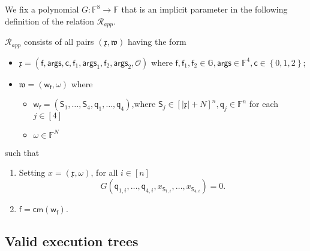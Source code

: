 \documentclass[11pt]{article} %
\newcommand{\G}{\ensuremath{{\mathbb G}}\xspace}
\newcommand{\F}{\ensuremath{\mathbb F}\xspace}
\newcommand{\cm}{\ensuremath{\mathsf{cm}}\xspace}
\newcommand{\wit}{\ensuremath{\mathsf{\omega}}\xspace}
\newcommand{\rel}{\ensuremath{\mathcal{R}}\xspace}
\newcommand{\set}[1]{\ensuremath{\left\{#1\right\}}\xspace}
\newcommand{\perm}{\mathsf{S}}
\newcommand{\f}{\ensuremath{\mathsf{f}}\xspace}
\newcommand{\relapp}{\ensuremath{\rel_{app}}\xspace}
\newcommand{\ops}{\ensuremath{\mathcal{O}}\xspace}
\newcommand{\instapp}{\ensuremath{\mathfrak{x}}\xspace}
\newcommand{\witapp}{\ensuremath{\mathfrak{w}}\xspace}
\newcommand{\witf}{\ensuremath{\mathsf{w_f}}\xspace}
\newcommand{\sel}{\ensuremath{\mathsf{q}}\xspace}
\newcommand{\args}{\ensuremath{\mathsf{args}}\xspace}
\newcommand{\callnum}{\ensuremath{\mathsf{c}}\xspace}
\begin{document}
We fix a polynomial $G:\F^8\to \F$ that is an implicit parameter in the following definition of the relation \relapp.

\relapp consists of all pairs $(\instapp, \witapp)$ having the form 
\begin{itemize}
 \item 
$\instapp= (\f,\args,\callnum, \f_1,\args_1, \f_2,\args_2,\ops)$
where $\f,\f_1,\f_2 \in \G,\args\in \F^4,\callnum\in \set{0,1,2}$; 
\item $\witapp=(\witf,\wit)$
where 
\begin{itemize}
 \item 
$\witf=(\perm_1,\ldots,\perm_4,\sel_1,\ldots,\sel_4)$,where $\perm_j \in [|\instapp|+N]^n,\sel_j \in \F^n$ for each $j\in [4]$
\item $\wit\in \F^N$
\end{itemize}
\end{itemize}
such that
\begin{enumerate}
                                                                                
\item  Setting $x=(\instapp,\wit)$, for all $i\in [n]$
\[G(\sel_{1,i},\ldots,\sel_{4,i},x_{\perm_{1,i}},\ldots,x_{\perm_{4,i}})=0.\]
\item $\f=\cm(\witf)$.
\end{enumerate}

\subsection{Valid execution trees}\label{sec:validexec}
\end{document}
